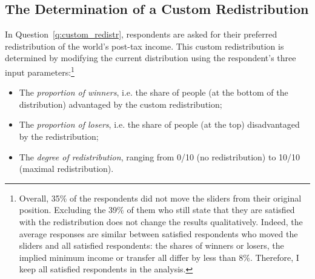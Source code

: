 \documentclass[12pt,english]{article}
\begin{document}
\begin{bibunit}
\clearpage
\section{The Determination of a Custom Redistribution}\label{app:algo}

In Question~\ref{q:custom_redistr}, respondents are asked for their preferred redistribution of the world's post-tax income. This custom redistribution is determined by modifying the current distribution using the respondent's three input parameters:\footnote{Overall, 35\% of the respondents did not move the sliders from their original position. Excluding the 39\% of them who still state that they are satisfied with the redistribution does not change the results qualitatively. Indeed, the average responses are similar between satisfied respondents who moved the sliders and all satisfied respondents: the shares of winners or losers, %
the implied minimum income or transfer %
all differ by less than 8\%. Therefore, I keep all satisfied respondents in the analysis. %
}
\begin{itemize}
    \item The \textit{proportion of winners}, i.e. the share of people (at the bottom of the distribution) advantaged by the custom redistribution;
    \item The \textit{proportion of losers}, i.e. the share of people (at the top) disadvantaged by the redistribution;
    \item The \textit{degree of redistribution}, ranging from 0/10 (no redistribution) to 10/10 (maximal redistribution).
\end{itemize}


\end{bibunit}
\end{document}
